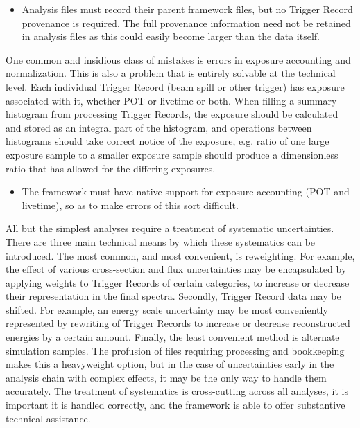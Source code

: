 \documentclass[../main-v1.tex]{subfiles}
\begin{document}
\begin{itemize}

\item Analysis files must record their parent framework files, but no Trigger Record provenance is required.  The full provenance information need not be retained in analysis files as this could easily become larger than the data itself.
\end{itemize}

One common and insidious class of mistakes is errors in exposure accounting and normalization. This is also a problem that is entirely solvable at the technical level.  Each individual Trigger Record (beam spill or other trigger) has exposure associated with it, whether POT or livetime or both. When filling a summary histogram from processing Trigger Records, the exposure should be calculated and stored as an integral part of the histogram, and operations between histograms should take correct notice of the exposure, e.g. ratio of one large exposure sample to a smaller exposure sample should produce a dimensionless ratio that has allowed for the differing exposures.

\begin{itemize}

\item The framework must have native support for exposure accounting (POT and livetime), so as to make errors of this sort difficult.
\end{itemize}


All but the simplest analyses require a treatment of systematic uncertainties. There are three main technical means by which these systematics can be introduced. The most common, and most convenient, is reweighting. For example, the effect of various cross-section and flux uncertainties may be encapsulated by applying weights to Trigger Records of certain categories, to increase or decrease their representation in the final spectra. Secondly, Trigger Record data may be shifted. For example, an energy scale uncertainty may be most conveniently represented by rewriting of Trigger Records to increase or decrease reconstructed energies by a certain amount. Finally, the least convenient method is alternate simulation samples. The profusion of files requiring processing and bookkeeping makes this a heavyweight option, but in the case of uncertainties early in the analysis chain with complex effects, it may be the only way to handle them accurately. The treatment of systematics is cross-cutting across all analyses, it is important it is handled correctly, and the framework is able to offer substantive technical assistance.
\end{document}
